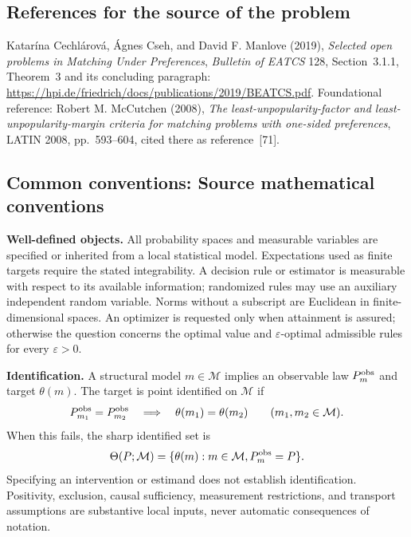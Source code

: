 \documentclass[11pt,a4paper]{article}
\begin{document}
\subsection*{References for the source of the problem}
Katar\'ina Cechl\'arov\'a, \'Agnes Cseh, and David F. Manlove (2019), \emph{Selected open problems in Matching Under Preferences}, \emph{Bulletin of EATCS} 128, Section~3.1.1, Theorem~3 and its concluding paragraph: \url{https://hpi.de/friedrich/docs/publications/2019/BEATCS.pdf}. Foundational reference: Robert M. McCutchen (2008), \emph{The least-unpopularity-factor and least-unpopularity-margin criteria for matching problems with one-sided preferences}, LATIN 2008, pp.~593--604, cited there as reference~[71].

\subsection*{Common conventions: Source mathematical conventions}

\textbf{Well-defined objects.}
All probability spaces and measurable variables are specified or inherited
from a local statistical model. Expectations used as finite targets require
the stated integrability. A decision rule or estimator is measurable with
respect to its available information; randomized rules may use an auxiliary
independent random variable. Norms without a subscript are Euclidean in
finite-dimensional spaces. An optimizer is requested only when attainment
is assured; otherwise the question concerns the optimal value and
$\varepsilon$-optimal admissible rules for every $\varepsilon>0$.

\textbf{Identification.}
A structural model $m\in\mathcal M$ implies an observable law
$P_m^{\rm obs}$ and target $\theta(m)$. The target is point identified on
$\mathcal M$ if
\[
 P_{m_1}^{\rm obs}=P_{m_2}^{\rm obs}
 \quad\Longrightarrow\quad\theta(m_1)=\theta(m_2)
 \qquad(m_1,m_2\in\mathcal M).
\]
When this fails, the sharp identified set is
\[
 \Theta(P;\mathcal M)=\{\theta(m):m\in\mathcal M,
                                  P_m^{\rm obs}=P\}.
\]
Specifying an intervention or estimand does not establish identification.
Positivity, exclusion, causal sufficiency, measurement restrictions, and
transport assumptions are substantive local inputs, never automatic
consequences of notation.
\end{document}
